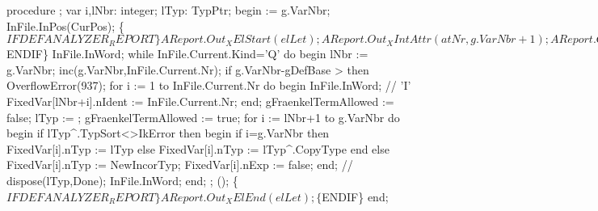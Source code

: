 \nwenddocs{}\endmoddef\nwstartdeflinemarkup{}\nwenddeflinemarkup
procedure ;
var
   i,lNbr: integer;
   lTyp: TypPtr;
begin
    := g.VarNbr;
   InFile.InPos(CurPos);
   \{$IFDEF ANALYZER_REPORT\}
   AReport.Out_XElStart(elLet);
   AReport.Out_XIntAttr(atNr, g.VarNbr+1);
   AReport.Out_XAttrEnd;
   \{$ENDIF\}
   InFile.InWord;
   while InFile.Current.Kind='Q' do
   begin
      lNbr := g.VarNbr;
      inc(g.VarNbr,InFile.Current.Nr);
      if g.VarNbr-gDefBase >  then
         OverflowError(937);
      for i := 1 to InFile.Current.Nr do
      begin
         InFile.InWord; // 'I'
         FixedVar[lNbr+i].nIdent := InFile.Current.Nr;
      end;
      gFraenkelTermAllowed := false;
      lTyp := ;
      gFraenkelTermAllowed := true;
      for i := lNbr+1 to g.VarNbr do
      begin
         if lTyp^.TypSort<>IkError then
         begin
            if i=g.VarNbr then
               FixedVar[i].nTyp := lTyp
            else FixedVar[i].nTyp := lTyp^.CopyType
         end
         else FixedVar[i].nTyp := NewIncorTyp;
         FixedVar[i].nExp := false;
      end;
      //   dispose(lTyp,Done);
      InFile.InWord;
   end;
   ;
   ();
   \{$IFDEF ANALYZER_REPORT\}
   AReport.Out_XElEnd(elLet);
   \{$ENDIF\}
end;
\eatline
{}\nwendcode{}\nwdocspar
